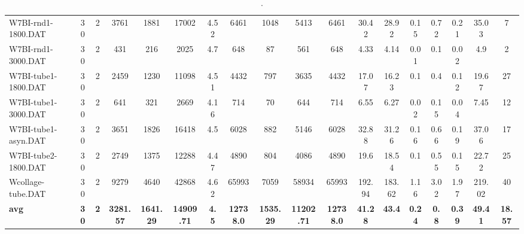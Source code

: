\begin{sidewaystable}[h]
{\begin{tabular}{lccccccccccccccccc}
W7BI-rnd1-1800.DAT & 30 & 2 & 3761 & 1881 & 17002 & 4.52 & 6461 & 1048 & 5413 & 6461 & 30.42 & 28.92 & 0.15 & 0.72 & 0.21 & 35.03 & 7\\
W7BI-rnd1-3000.DAT & 30 & 2 & 431 & 216 & 2025 & 4.7 & 648 & 87 & 561 & 648 & 4.33 & 4.14 & 0.01 & 0.1 & 0.02 & 4.9 & 2\\
W7BI-tube1-1800.DAT & 30 & 2 & 2459 & 1230 & 11098 & 4.51 & 4432 & 797 & 3635 & 4432 & 17.07 & 16.23 & 0.1 & 0.4 & 0.12 & 19.67 & 27\\
W7BI-tube1-3000.DAT & 30 & 2 & 641 & 321 & 2669 & 4.16 & 714 & 70 & 644 & 714 & 6.55 & 6.27 & 0.02 & 0.15 & 0.04 & 7.45 & 12\\
W7BI-tube1-asyn.DAT & 30 & 2 & 3651 & 1826 & 16418 & 4.5 & 6028 & 882 & 5146 & 6028 & 32.88 & 31.26 & 0.16 & 0.66 & 0.19 & 37.06 & 17\\
W7BI-tube2-1800.DAT & 30 & 2 & 2749 & 1375 & 12288 & 4.47 & 4890 & 804 & 4086 & 4890 & 19.6 & 18.54 & 0.1 & 0.55 & 0.15 & 22.72 & 25\\
Wcollage-tube.DAT & 30 & 2 & 9279 & 4640 & 42868 & 4.62 & 65993 & 7059 & 58934 & 65993 & 192.94 & 183.62 & 1.16 & 3.02 & 1.97 & 219.02 & 40\\
\cline{1-18} \textbf{avg} & \textbf{30} & \textbf{2} & \textbf{3281.57} & \textbf{1641.29} & \textbf{14909.71} & \textbf{4.5} & \textbf{12738.0} & \textbf{1535.29} & \textbf{11202.71} & \textbf{12738.0} & \textbf{41.28} & \textbf{43.4} & \textbf{0.24} & \textbf{0.8} & \textbf{0.39} & \textbf{49.41} & \textbf{18.57} \\ \cline{1-18}
\bottomrule
\end{tabular}%
}%
\caption{.}
\label{tab:table_bc}
\end{sidewaystable}

